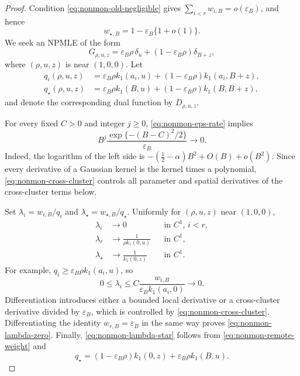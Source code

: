 \begin{proof}
Condition \eqref{eq:nonmon-old-negligible} gives
\(\sum_{i<r}w_{i,B}=o(\varepsilon_B)\), and hence
\begin{equation}
\label{eq:nonmon-remote-weight}
    w_{\star,B}=1-\varepsilon_B\{1+o(1)\}.
\end{equation}
We seek an NPMLE of the form
\[
    G_{\rho,u,z}
    =
    \varepsilon_B\rho\,\delta_u
    +(1-\varepsilon_B\rho)\delta_{B+z},
\]
where \((\rho,u,z)\) is near \((1,0,0)\). Let
\begin{align*}
    q_i(\rho,u,z)
    &=
    \varepsilon_B\rho k_1(a_i,u)
    +(1-\varepsilon_B\rho)k_1(a_i,B+z),\\
    q_\star(\rho,u,z)
    &=
    \varepsilon_B\rho k_1(B,u)
    +(1-\varepsilon_B\rho)k_1(B,B+z),
\end{align*}
and denote the corresponding dual function by \(D_{\rho,u,z}\).

For every fixed \(C>0\) and integer \(j\ge0\),
\eqref{eq:nonmon-eps-rate} implies
\begin{equation}
\label{eq:nonmon-cross-cluster}
    B^j\frac{\exp\{-(B-C)^2/2\}}{\varepsilon_B}\longrightarrow0.
\end{equation}
Indeed, the logarithm of the left side is
\(-(\frac12-\alpha)B^2+O(B)+o(B^2)\). Since every derivative of a Gaussian
kernel is the kernel times a polynomial,
\eqref{eq:nonmon-cross-cluster} controls all parameter and spatial
derivatives of the cross-cluster terms below.

Set \(\lambda_i=w_{i,B}/q_i\) and
\(\lambda_\star=w_{\star,B}/q_\star\). Uniformly for
\((\rho,u,z)\) near \((1,0,0)\),
\begin{align}
    \lambda_i&\to0
      &&\text{in \(C^1\), }i<r,\label{eq:nonmon-lambda-small}\\
    \lambda_r&\to\frac{1}{\rho k_1(0,u)}
      &&\text{in \(C^1\)},\label{eq:nonmon-lambda-zero}\\
    \lambda_\star&\to\frac{1}{k_1(0,z)}
      &&\text{in \(C^1\)}.\label{eq:nonmon-lambda-star}
\end{align}
For example, \(q_i\ge\varepsilon_B\rho k_1(a_i,u)\), so
\[
    0\le\lambda_i
    \le
    C\frac{w_{i,B}}{\varepsilon_Bk_1(a_i,0)}
    \longrightarrow0.
\]
Differentiation introduces either a bounded local derivative or a
cross-cluster derivative divided by \(\varepsilon_B\), which is controlled
by \eqref{eq:nonmon-cross-cluster}. Differentiating the identity
\(w_{r,B}=\varepsilon_B\) in the same way proves
\eqref{eq:nonmon-lambda-zero}. Finally,
\eqref{eq:nonmon-lambda-star} follows from
\eqref{eq:nonmon-remote-weight} and
\[
    q_\star
    =
    (1-\varepsilon_B\rho)k_1(0,z)
    +\varepsilon_B\rho k_1(B,u).
\]


\end{proof}
